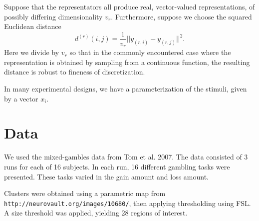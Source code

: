 \documentclass[12pt]{article}
\begin{document}
Suppose that the representators all produce real, vector-valued representations, of possibly differing dimensionality $v_r$.  Furthermore, suppose we choose the squared Euclidean distance
\[
d^{(r)}(i, j) = \frac{1}{v_r} ||y_{(r, i)} - y_{(r, j)}||^2.
\]
Here we divide by $v_r$ so that in the commonly encountered case where the representation is obtained by
sampling from a continuous function, the resulting distance is robust to fineness of discretization.

In many experimental designs, we have a parameterization of the stimuli, given by a vector $x_i$.

\section{Data}

We used the mixed-gambles data from Tom et al. 2007.
The data consisted of 3 runs for each of 16 subjects.
In each run, 16 different gambling tasks were presented.
These tasks varied in the gain amount and loss amount.

Clusters were obtained using a parametric map from {\tt http://neurovault.org/images/10680/},
then applying thresholding using FSL.
A size threshold was applied, yielding 28 regions of interest.
\end{document}
